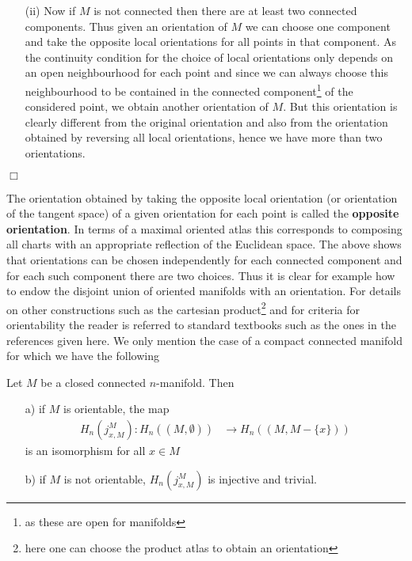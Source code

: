 \begin{prf}
\begin{enumerate}
\item[(ii)]
Now if $M$ is not connected then there are at least two connected components. Thus given an orientation of $M$ we can choose one component and take the opposite local orientations for all points in that component. As the continuity condition for the choice of local orientations only depends on an open neighbourhood for each point and since we can always choose this neighbourhood to be contained in the connected component\footnote{as these are open for manifolds} of the considered point, we obtain another orientation of $M$. But this orientation is clearly different from the original orientation and also from the orientation obtained by reversing all local orientations, hence we have more than two orientations.
\end{enumerate}
\phantom{proven}
\hfill
$\Box$
\end{prf}
The orientation obtained by taking the opposite local orientation (or orientation of the tangent space) of a given orientation for each point is called the \textbf{opposite orientation}. In terms of a maximal oriented atlas this corresponds to composing all charts with an appropriate reflection of the Euclidean space. The above shows that orientations can be chosen independently for each connected component and for each such component there are two choices. Thus it is clear for example how to endow the disjoint union of oriented manifolds with an orientation. For details on other constructions such as the cartesian product\footnote{here one can choose the product atlas to obtain an orientation} and for criteria for orientability the reader is referred to standard textbooks such as the ones in the references given here. We only mention the case of a compact connected manifold for which we have the following
\\
\begin{thm}
\label{thm:compactconn}
Let $M$ be a closed connected $n$-manifold. Then
\begin{enumerate}
\item[a)]
if $M$ is orientable, the map
\begin{align*}
  H_{n}(j_{x,M}^{M})
  \colon
  H_{n}((M,\emptyset))
  &\to
  H_{n}((M,M - \lbrace x \rbrace))
\end{align*}
is an isomorphism for all $x \in M$

\item[b)]
if $M$ is not orientable, $H_{n}(j_{x,M}^{M})$ is injective and trivial.
\end{enumerate}
\end{thm}

